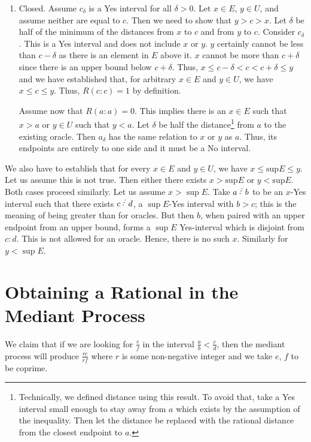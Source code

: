 \documentclass[12pt]{article}
\begin{document}
\begin{enumerate}
    \item Closed. Assume $c_\delta$ is a Yes interval for all $\delta > 0$. Let $x \in E$, $y \in U$, and assume neither are equal to $c$. Then we need to show that $y > c > x$. Let $\delta$ be half of the minimum of the distances from $x$ to $c$ and from $y$ to $c$. Consider $c_\delta$. This is a Yes interval and does not include $x$ or $y$. $y$ certainly cannot be less than $c-\delta$ as there is an element in $E$ above it. $x$ cannot be more than $c+\delta$ since there is an upper bound below $c+\delta$. Thus, $x \leq c-\delta < c <  c+\delta \leq y$ and we have established that, for arbitrary $x \in E$ and $y \in U$, we have $x \leq  c \leq y$. Thus, $R(c:c)=1$ by definition. 

    Assume now that $R(a:a)=0$. This implies there is an $x \in E$ such that $x > a$ or $y \in U$ such that $y < a$. Let $\delta$ be half the distance\footnote{Technically, we defined distance using this result. To avoid that, take a Yes interval small enough to stay away from $a$ which exists by the assumption of the inequality. Then let the distance be replaced with the rational distance from the closest endpoint to $a$.} from $a$ to the existing oracle. Then $a_\delta$ has the same relation to $x$ or $y$ as $a$. Thus, its endpoints are entirely to one side and it must be a No interval. 

\end{enumerate}

We also have to establish that for every $x \in E$ and $y \in U$, we have $x \leq \mathrm{sup} E \leq y$. Let us assume this is not true. Then either there exists $x > \mathrm{sup} E$ or $y < \mathrm{sup} E$. Both cases proceed similarly. Let us 
assume $ x > \sup E$. Take $a \lte b$ to be an $x$-Yes interval such that there exists $c \lte d$, a $\sup E$-Yes interval with $b > c$; this is the meaning of being greater than for oracles. But then $b$, when paired with an upper endpoint from an upper bound, forms a $\sup E$ Yes-interval which is disjoint from $c:d$. This is not allowed for an oracle. Hence, there is no such $x$. Similarly for $y < \sup E$. 

\section{Obtaining a Rational in the Mediant Process}\label{app:med}

We claim that if we are looking for $\frac{e}{f}$ in the interval $\frac{a}{b} \lt \frac{c}{d}$, then the mediant process will produce $\frac{re}{rf}$ where $r$ is some non-negative integer and we take $e$, $f$ to be coprime. 
\end{document}
